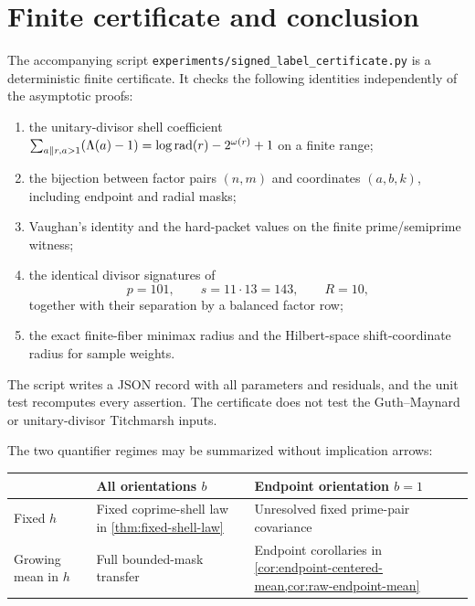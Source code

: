 \section{Finite certificate and conclusion}
\label{sec:computation-conclusion}

The accompanying script
\texttt{experiments/signed\_label\_certificate.py} is a deterministic
finite certificate.  It checks the following identities independently of
the asymptotic proofs:
\begin{enumerate}[label=\textup{(\roman*)}]
 \item the unitary-divisor shell coefficient
 $\sum_{a\parallel r,a>1}(\Lambda(a)-1)
 =\log\operatorname{rad}(r)-2^{\omega(r)}+1$ on a finite range;
 \item the bijection between factor pairs $(n,m)$ and coordinates
 $(a,b,k)$, including endpoint and radial masks;
 \item Vaughan's identity and the hard-packet values on the finite
 prime/semiprime witness;
 \item the identical divisor signatures of
 \begin{equation}
  p=101,\qquad s=11\cdot13=143,\qquad R=10,
  \label{eq:finite-null-witness}
 \end{equation}
 together with their separation by a balanced factor row;
 \item the exact finite-fiber minimax radius and the Hilbert-space
 shift-coordinate radius for sample weights.
\end{enumerate}
The script writes a JSON record with all parameters and residuals, and the
unit test recomputes every assertion.  The certificate does not test the
Guth--Maynard or unitary-divisor Titchmarsh inputs.

The two quantifier regimes may be summarized without implication arrows:
\begin{center}
\small
\begin{tabular}{
 >{\raggedright\arraybackslash}p{}
 >{\raggedright\arraybackslash}p{}
 >{\raggedright\arraybackslash}p{}}
\toprule
 & All orientations $b$ & Endpoint orientation $b=1$\\
\midrule
Fixed $h$ & Fixed coprime-shell law in \cref{thm:fixed-shell-law}
& Unresolved fixed prime-pair covariance\\
Growing mean in $h$ & Full bounded-mask transfer
& Endpoint corollaries in \cref{cor:endpoint-centered-mean,cor:raw-endpoint-mean}\\
\bottomrule
\end{tabular}
\end{center}

